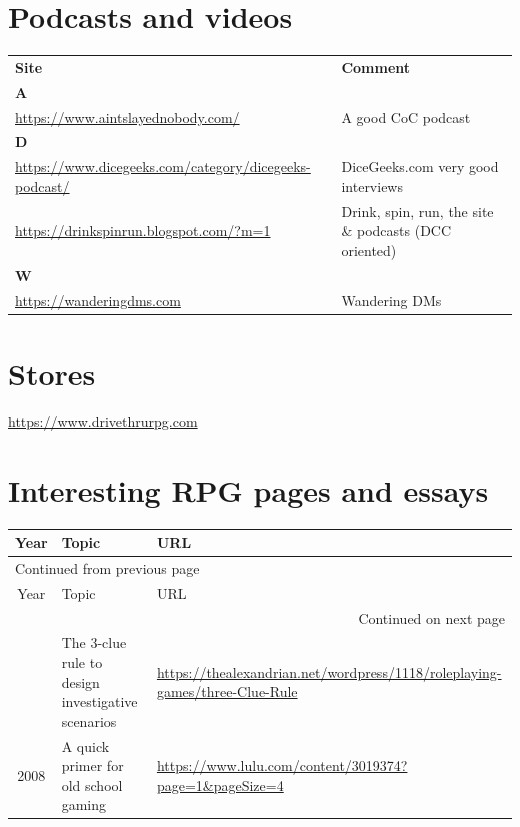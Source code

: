 \documentclass[a4paper, 11pt, twoside]{article}
\begin{document}
\section{Podcasts and videos}
\label{sec:orgbb16b48}

\begin{longtable}{p{6cm}p{8cm}}
\textbf{Site} & \textbf{Comment}\\
\textbf{A} & \\
\url{https://www.aintslayednobody.com/} & A good CoC podcast\\
\textbf{D} & \\
\url{https://www.dicegeeks.com/category/dicegeeks-podcast/} & DiceGeeks.com very good interviews\\
\url{https://drinkspinrun.blogspot.com/?m=1} & Drink, spin, run, the site \& podcasts (DCC oriented)\\
\textbf{W} & \\
\url{https://wanderingdms.com} & Wandering DMs\\
\end{longtable}

\section{Stores}
\label{sec:orgdb52548}

\url{https://www.drivethrurpg.com}

\section{Interesting RPG pages and essays}
\label{sec:org732f1cc}

\begin{longtable}{cp{8cm}p{6cm}}
Year & Topic & URL\\
\hline
\endfirsthead
\multicolumn{3}{l}{Continued from previous page} \\
\hline

Year & Topic & URL \\

\hline
\endhead
\hline\multicolumn{3}{r}{Continued on next page} \\
\endfoot
\endlastfoot
\hline
2008 & The 3-clue rule to design investigative scenarios & \url{https://thealexandrian.net/wordpress/1118/roleplaying-games/three-Clue-Rule}\\
2008 & A quick primer for old school gaming & \url{https://www.lulu.com/content/3019374?page=1\&pageSize=4}\\
\end{longtable}
\end{document}
